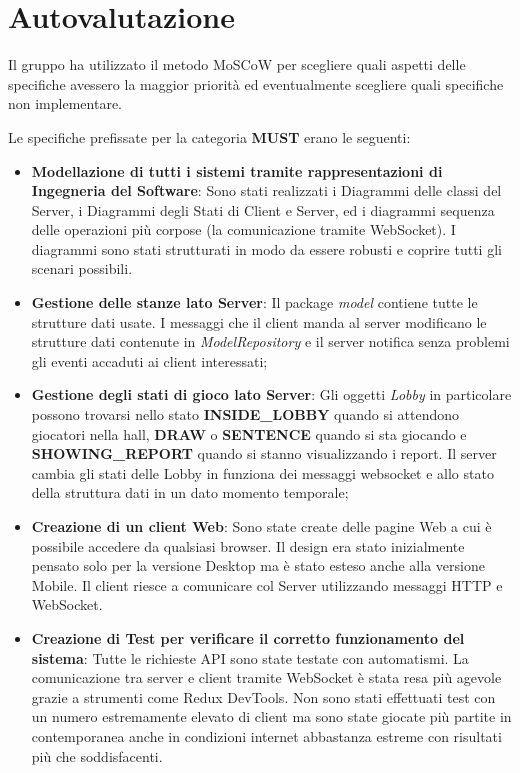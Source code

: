 \section{Autovalutazione}
Il gruppo ha utilizzato il metodo MoSCoW per scegliere quali aspetti delle specifiche avessero la maggior priorità ed eventualmente scegliere quali specifiche non implementare.

\noindent Le specifiche prefissate per la categoria \textbf{MUST} erano le seguenti:
\begin{itemize}
    \item \textbf{Modellazione di tutti i sistemi tramite rappresentazioni di Ingegneria del Software}:\newline
    Sono stati realizzati i Diagrammi delle classi del Server, i Diagrammi degli Stati di Client e Server, ed i diagrammi sequenza delle operazioni più corpose (la comunicazione tramite WebSocket). I diagrammi sono stati strutturati in modo da essere robusti e coprire tutti gli scenari possibili.
    \item \textbf{Gestione delle stanze lato Server}:\newline
    Il package \textit{model} contiene tutte le strutture dati usate. I messaggi che il client manda al server modificano le strutture dati contenute in \textit{ModelRepository} e il server notifica senza problemi gli eventi accaduti ai client interessati;
    \item \textbf{Gestione degli stati di gioco lato Server}:\newline
    Gli oggetti \textit{Lobby} in particolare possono trovarsi nello stato \textbf{INSIDE\_LOBBY} quando si attendono giocatori nella hall, \textbf{DRAW} o \textbf{SENTENCE} quando si sta giocando e \textbf{SHOWING\_REPORT} quando si stanno visualizzando i report. Il server cambia gli stati delle Lobby in funziona dei messaggi websocket e allo stato della struttura dati in un dato momento temporale;
    \item \textbf{Creazione di un client Web}:\newline
    Sono state create delle pagine Web a cui è possibile accedere da qualsiasi browser. Il design era stato inizialmente pensato solo per la versione Desktop ma è stato esteso anche alla versione Mobile. Il client riesce a comunicare col Server utilizzando messaggi HTTP e WebSocket.
    \item \textbf{Creazione di Test per verificare il corretto funzionamento del sistema}:
    Tutte le richieste API sono state testate con automatismi. La comunicazione tra server e client tramite WebSocket è stata resa più agevole grazie a strumenti come Redux DevTools. Non sono stati effettuati test con un numero estremamente elevato di client ma sono state giocate più partite in contemporanea anche in condizioni internet abbastanza estreme con risultati più che soddisfacenti.
\end{itemize}


